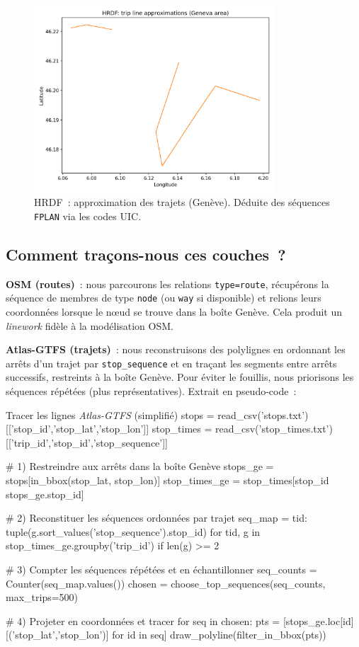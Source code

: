 \begin{figure}[H]
  \centering
  \includegraphics[width=0.8\textwidth]{../figures/chap4/geneva_hrdf_trip_lines.png}
  \caption{HRDF : approximation des trajets (Genève). Déduite des séquences \texttt{FPLAN} via les codes UIC.}
\end{figure}

\subsection*{Comment traçons-nous ces couches ?}
\textbf{OSM (routes)} : nous parcourons les relations \texttt{type=route}, récupérons la séquence de membres de type \texttt{node} (ou \texttt{way} si disponible) et relions leurs coordonnées lorsque le nœud se trouve dans la boîte Genève. Cela produit un \emph{linework} fidèle à la modélisation OSM.

\textbf{Atlas-GTFS (trajets)} : nous reconstruisons des polylignes en ordonnant les arrêts d'un trajet par \texttt{stop\_sequence} et en traçant les segments entre arrêts successifs, restreints à la boîte Genève. Pour éviter le fouillis, nous priorisons les séquences répétées (plus représentatives). Extrait en pseudo-code :

\begin{codebox}[language=Python]{Tracer les lignes \emph{Atlas-GTFS} (simplifié)}
stops = read_csv('stops.txt')[['stop_id','stop_lat','stop_lon']]
stop_times = read_csv('stop_times.txt')[['trip_id','stop_id','stop_sequence']]

# 1) Restreindre aux arrêts dans la boîte Genève
stops_ge = stops[in_bbox(stop_lat, stop_lon)]
stop_times_ge = stop_times[stop_id \in stops_ge.stop_id]

# 2) Reconstituer les séquences ordonnées par trajet
seq_map = {tid: tuple(g.sort_values('stop_sequence').stop_id)
           for tid, g in stop_times_ge.groupby('trip_id') if len(g) >= 2}

# 3) Compter les séquences répétées et en échantillonner
seq_counts = Counter(seq_map.values())
chosen = choose_top_sequences(seq_counts, max_trips=500)

# 4) Projeter en coordonnées et tracer
for seq in chosen:
    pts = [stops_ge.loc[id][('stop_lat','stop_lon')] for id in seq]
    draw_polyline(filter_in_bbox(pts))
\end{codebox}

